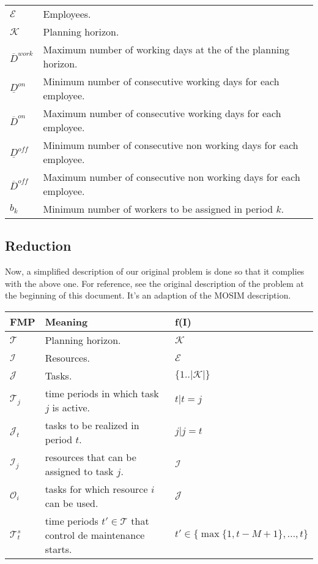 \documentclass[a4paper,11pt]{article}
\begin{document}
    \begin{tabular}{ll}
        $\mathcal{E}$          & Employees. \\
        $\mathcal{K}$          & Planning horizon. \\
        $\overline{D}^{work}$  & Maximum number of working days at the of the planning horizon. \\
        $\underline{D}^{on}$   & Minimum number of consecutive working days for each employee. \\
        $\overline{D}^{on}$    & Maximum number of consecutive working days for each employee. \\
        $\underline{D}^{off}$  & Minimum number of consecutive non working days for each employee. \\
        $\overline{D}^{off}$   & Maximum number of consecutive non working days for each employee. \\
        $b_k$                  & Minimum number of workers to be assigned in period $k$. \\
    \end{tabular}

    \subsection{Reduction}

    Now, a simplified description of our original problem is done so that it complies with the above one. For reference, see the original description of the problem at the beginning of this document. It's an adaption of the MOSIM description.

        \begin{tabular}{l|l|l}
        \textbf{FMP}        &  \textbf{Meaning} & \textbf{f(I)} \\ \hline
        $\mathcal{T}$       &  Planning horizon. & $ \mathcal{K} $ \\
        $\mathcal{I}$       &  Resources. & $ \mathcal{E} $ \\
        $\mathcal{J}$       &  Tasks.  & $ \{1 .. |\mathcal{K}|\} $ \\
        $\mathcal{T}_j$     &  time periods in which task $j$ is active. & $ t | t = j $ \\
        $\mathcal{J}_t$     &  tasks to be realized in period $t$. & $ j | j = t $ \\
        $\mathcal{I}_j$     &  resources that can be assigned to task $j$. & $ \mathcal{I} $\\
        $\mathcal{O}_i$     &  tasks for which resource $i$ can be used. & $ \mathcal{J} $ \\
        $\mathcal{T}^{s}_t$ &  time periods $t' \in \mathcal{T}$ that control de maintenance starts. & $t' \in \{ \max{\{1, t - M+1\}},  ..., {t}\}$ \\
    \end{tabular}
\end{document}
